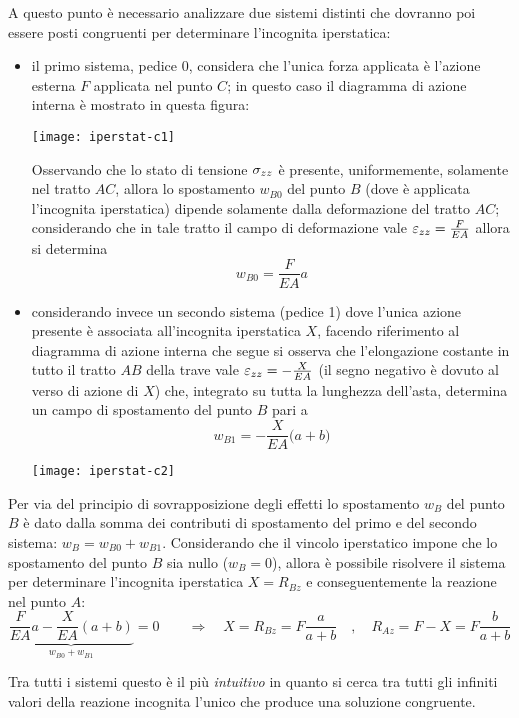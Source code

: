 		A questo punto è necessario analizzare due sistemi distinti che dovranno poi essere posti congruenti per determinare l'incognita iperstatica:
		\begin{itemize}
			\item il primo sistema, pedice 0, considera che l'unica forza applicata è l'azione esterna $F$ applicata nel punto $C$; in questo caso il diagramma di azione interna è mostrato in questa figura:
			\begin{center}
				\texttt{[image: iperstat-c1]}			
			\end{center}
			Osservando che lo stato di tensione $\sigma_{zz}$ è presente, uniformemente, solamente nel tratto $AC$, allora lo spostamento $w_{B0}$ del punto $B$ (dove è applicata l'incognita iperstatica) dipende solamente dalla deformazione del tratto $AC$; considerando che in tale tratto il campo di deformazione vale $\varepsilon_{zz} = \frac F{EA}$ allora si determina
			\[ w_{B0} = \frac F{EA} a \] 
			
			\item considerando invece un secondo sistema (pedice 1) dove l'unica azione presente è associata all'incognita iperstatica $X$, facendo riferimento al diagramma di azione interna che segue si osserva che l'elongazione costante in tutto il tratto $AB$ della trave vale $\varepsilon_{zz} = - \frac{X}{EA}$ (il segno negativo è dovuto al verso di azione di $X$) che, integrato su tutta la lunghezza dell'asta, determina un campo di spostamento del punto $B$ pari a 
			\[ w_{B1} = - \frac X {EA} \big(a + b\big) \]
			\begin{center}
				\texttt{[image: iperstat-c2]}			
			\end{center}
			
		\end{itemize}
		Per via del principio di sovrapposizione degli effetti lo spostamento $w_B$ del punto $B$ è dato dalla somma dei contributi di spostamento del primo e del secondo sistema: $w_B = w_{B0} + w_{B1}$. Considerando che il vincolo iperstatico impone che lo spostamento del punto $B$ sia nullo  ($w_B = 0$), allora è possibile risolvere il sistema per determinare l'incognita iperstatica $X = R_{Bz}$ e conseguentemente la reazione nel punto $A$:
		\[ \underbrace{\frac F{EA} a - \frac X{EA} (a+b)}_{w_{B0}+w_{B1}} = 0 \qquad \Rightarrow \quad X = R_{Bz}= F \frac a {a+b} \quad,\quad R_{Az} = F - X = F \frac b{a+b}   \] 
		
		\begin{osservazione}
			Tra tutti i sistemi questo è il più \textit{intuitivo} in quanto si cerca tra tutti gli infiniti valori della reazione incognita l'unico che produce una soluzione congruente.
		\end{osservazione}
	
